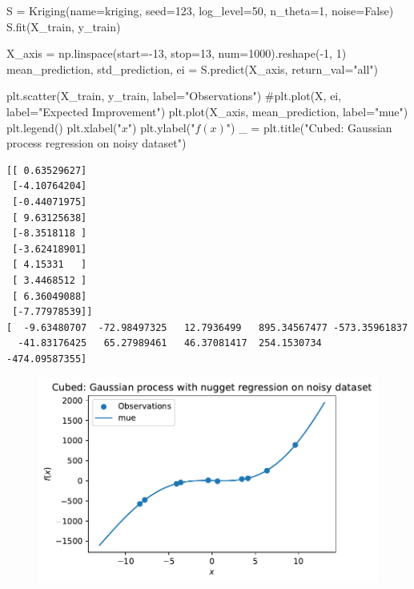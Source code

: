 \documentclass[
  letterpaper,
  DIV=11,
  numbers=noendperiod]{scrreprt}
\newenvironment{Shaded}{\begin{snugshade}}{\end{snugshade}}
\newcommand{\CommentTok}[1]{\textcolor[rgb]{0.37,0.37,0.37}{#1}}
\newcommand{\DecValTok}[1]{\textcolor[rgb]{0.68,0.00,0.00}{#1}}
\newcommand{\NormalTok}[1]{\textcolor[rgb]{0.00,0.23,0.31}{#1}}
\newcommand{\OperatorTok}[1]{\textcolor[rgb]{0.37,0.37,0.37}{#1}}
\newcommand{\StringTok}[1]{\textcolor[rgb]{0.13,0.47,0.30}{#1}}
\newcommand{\VariableTok}[1]{\textcolor[rgb]{0.07,0.07,0.07}{#1}}
\begin{document}
\begin{Shaded}
\begin{Highlighting}[]
\NormalTok{S }\OperatorTok{=}\NormalTok{ Kriging(name}\OperatorTok{=}\StringTok{\textquotesingle{}kriging\textquotesingle{}}\NormalTok{,  seed}\OperatorTok{=}\DecValTok{123}\NormalTok{, log\_level}\OperatorTok{=}\DecValTok{50}\NormalTok{, n\_theta}\OperatorTok{=}\DecValTok{1}\NormalTok{, noise}\OperatorTok{=}\VariableTok{False}\NormalTok{)}
\NormalTok{S.fit(X\_train, y\_train)}

\NormalTok{X\_axis }\OperatorTok{=}\NormalTok{ np.linspace(start}\OperatorTok{={-}}\DecValTok{13}\NormalTok{, stop}\OperatorTok{=}\DecValTok{13}\NormalTok{, num}\OperatorTok{=}\DecValTok{1000}\NormalTok{).reshape(}\OperatorTok{{-}}\DecValTok{1}\NormalTok{, }\DecValTok{1}\NormalTok{)}
\NormalTok{mean\_prediction, std\_prediction, ei }\OperatorTok{=}\NormalTok{ S.predict(X\_axis, return\_val}\OperatorTok{=}\StringTok{"all"}\NormalTok{)}

\NormalTok{plt.scatter(X\_train, y\_train, label}\OperatorTok{=}\StringTok{"Observations"}\NormalTok{)}
\CommentTok{\#plt.plot(X, ei, label="Expected Improvement")}
\NormalTok{plt.plot(X\_axis, mean\_prediction, label}\OperatorTok{=}\StringTok{"mue"}\NormalTok{)}
\NormalTok{plt.legend()}
\NormalTok{plt.xlabel(}\StringTok{"$x$"}\NormalTok{)}
\NormalTok{plt.ylabel(}\StringTok{"$f(x)$"}\NormalTok{)}
\NormalTok{\_ }\OperatorTok{=}\NormalTok{ plt.title(}\StringTok{"Cubed: Gaussian process regression on noisy dataset"}\NormalTok{)}
\end{Highlighting}
\end{Shaded}

\begin{verbatim}
[[ 0.63529627]
 [-4.10764204]
 [-0.44071975]
 [ 9.63125638]
 [-8.3518118 ]
 [-3.62418901]
 [ 4.15331   ]
 [ 3.4468512 ]
 [ 6.36049088]
 [-7.77978539]]
[  -9.63480707  -72.98497325   12.7936499   895.34567477 -573.35961837
  -41.83176425   65.27989461   46.37081417  254.1530734  -474.09587355]
\end{verbatim}

\begin{figure}[H]

{\centering \includegraphics{012_num_spot_ei_files/figure-pdf/cell-54-output-2.pdf}

}

\end{figure}
\end{document}
